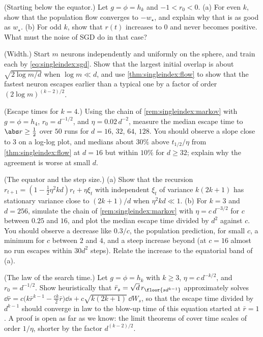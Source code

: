 \begin{refsection}
\begin{exercises}
\item \variation (Starting below the equator.) Let $g=\phi=h_k$ and $-1<r_0<0$. (a) For even $k$, show that the population flow converges to $-w_\star$, and explain why that is as good as $w_\star$. (b) For odd $k$, show that $r(t)$ increases to $0$ and never becomes positive. What must the noise of SGD do in that case?\label{ex:singleindex:sign}

\item \variation (Width.) Start $m$ neurons independently and uniformly on the sphere, and train each by \eqref{eq:singleindex:sgd}. Show that the largest initial overlap is about $\sqrt{2\log m/d}$ when $\log m\ll d$, and use \cref{thm:singleindex:flow} to show that the fastest neuron escapes earlier than a typical one by a factor of order $(2\log m)^{(k-2)/2}$.\label{ex:singleindex:width}

\item \simulation (Escape times for $k=4$.) Using the chain of \cref{rem:singleindex:markov} with $g=\phi=h_4$, $r_0=d^{-1/2}$, and $\eta=0.02\,d^{-2}$, measure the median escape time to $\abs r\ge\frac12$ over $50$ runs for $d=16$, $32$, $64$, $128$. You should observe a slope close to $3$ on a log-log plot, and medians about $30\%$ above $t_{1/2}/\eta$ from \cref{thm:singleindex:flow} at $d=16$ but within $10\%$ for $d\ge32$; explain why the agreement is worse at small $d$.\label{ex:singleindex:k4}

\item \simulation (The equator and the step size.) (a) Show that the recursion $r_{t+1}=(1-\frac12\eta^2kd)r_t+\eta\xi_t$ with independent $\xi_t$ of variance $k(2k+1)$ has stationary variance close to $(2k+1)/d$ when $\eta^2kd\ll1$. (b) For $k=3$ and $d=256$, simulate the chain of \cref{rem:singleindex:markov} with $\eta=c\,d^{-3/2}$ for $c$ between $0.25$ and $16$, and plot the median escape time divided by $d^2$ against $c$. You should observe a decrease like $0.3/c$, the population prediction, for small $c$, a minimum for $c$ between $2$ and $4$, and a steep increase beyond (at $c=16$ almost no run escapes within $30d^2$ steps). Relate the increase to the equatorial band of (a).\label{ex:singleindex:stepsize}

\item \research (The law of the search time.) Let $g=\phi=h_k$ with $k\ge3$, $\eta=c\,d^{-k/2}$, and $r_0=d^{-1/2}$. Show heuristically that $\bar r_s=\sqrt d\,r_{\floor{sd^{k-1}}}$ approximately solves $\dd\bar r=c\bigl(k\bar r^{k-1}-\frac{ck}2\bar r\bigr)\dd s+c\sqrt{k(2k+1)}\,\dd W_s$, so that the escape time divided by $d^{k-1}$ should converge in law to the blow-up time of this equation started at $\bar r=1$. A proof is open as far as we know: the limit theorems of \textcite{BenArousGheissariJagannath2022} cover time scales of order $1/\eta$, shorter by the factor $d^{(k-2)/2}$.\label{ex:singleindex:law}


\end{exercises}
\end{refsection}
